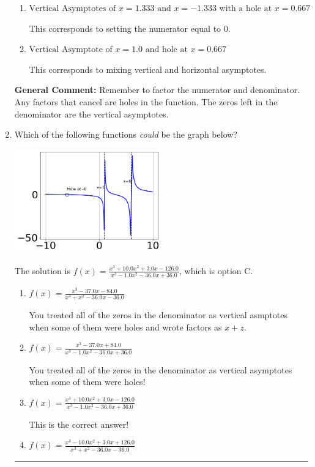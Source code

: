 \documentclass{extbook}[14pt]
\newcommand{\litem}[1]{\item #1

\rule{\textwidth}{0.4pt}}
\begin{document}
\begin{enumerate}
{\begin{enumerate}[label=\Alph*.]
This corresponds to not factoring out the hole.
\item \( \text{Vertical Asymptotes of } x = 1.333 \text{ and } x = -1.333 \text{ with a hole at } x = 0.667 \)

This corresponds to setting the numerator equal to 0.
\item \( \text{Vertical Asymptote of } x = 1.0 \text{ and hole at } x = 0.667 \)

This corresponds to mixing vertical and horizontal asymptotes.
\end{enumerate}

\textbf{General Comment:} Remember to factor the numerator and denominator. Any factors that cancel are holes in the function. The zeros left in the denominator are the vertical asymptotes.
}
\litem{
Which of the following functions \textit{could} be the graph below?

\begin{center}
    \includegraphics[width=0.5\textwidth]{../Figures/identifyGraphOfRationalFunctionCopyA.png}
\end{center}


The solution is \( f(x)=\frac{x^{3} +10.0 x^{2} +3.0 x -126.0}{x^{3} -1.0 x^{2} -36.0 x + 36.0} \), which is option C.\begin{enumerate}[label=\Alph*.]
\item \( f(x)=\frac{x^{3} -37.0 x -84.0}{x^{3} + x^{2} -36.0 x -36.0} \)

You treated all of the zeros in the denominator as vertical asmptotes when some of them were holes and wrote factors as $x+z$.
\item \( f(x)=\frac{x^{3} -37.0 x + 84.0}{x^{3} -1.0 x^{2} -36.0 x + 36.0} \)

You treated all of the zeros in the denominator as vertical asymptotes when some of them were holes!
\item \( f(x)=\frac{x^{3} +10.0 x^{2} +3.0 x -126.0}{x^{3} -1.0 x^{2} -36.0 x + 36.0} \)

This is the correct answer!
\item \( f(x)=\frac{x^{3} -10.0 x^{2} +3.0 x + 126.0}{x^{3} + x^{2} -36.0 x -36.0} \)


\end{enumerate}}
\end{enumerate}
\end{document}

